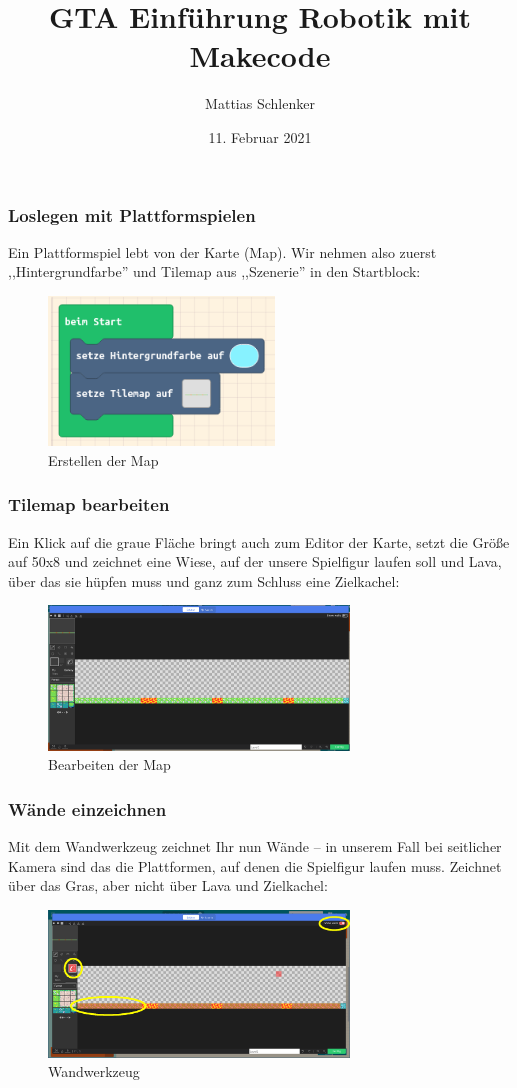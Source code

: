 \documentclass{beamer}
\title{GTA Einführung Robotik mit Makecode}
\author{Mattias Schlenker}
\institute{Wilhelm-Ostwald-Gymnasium}
\date{11. Februar 2021}
\begin{document}
\frame{\titlepage}

\begin{frame}
\frametitle{Loslegen mit Plattformspielen}
 
Ein Plattformspiel lebt von der Karte (Map). Wir nehmen also zuerst ,,Hintergrundfarbe'' und Tilemap aus ,,Szenerie'' in den Startblock:
 
 \begin{figure}
  \includegraphics[width=6cm]{game24.png}
  \caption{Erstellen der Map}
  \label{fig:game24}
\end{figure}

\end{frame}

\begin{frame}
 \frametitle{Tilemap bearbeiten}
 
 Ein Klick auf die graue Fläche bringt auch zum Editor der Karte, setzt die Größe auf 50x8 und zeichnet eine Wiese, auf der unsere Spielfigur laufen soll und Lava, über das sie hüpfen muss und ganz zum Schluss eine Zielkachel:
 
\begin{figure}
  \includegraphics[width=8cm]{game25.png}
  \caption{Bearbeiten der Map}
  \label{fig:game25}
\end{figure}
\end{frame}

\begin{frame}
 \frametitle{Wände einzeichnen}
 
  Mit dem Wandwerkzeug zeichnet Ihr nun Wände – in unserem Fall bei seitlicher Kamera sind das die Plattformen, auf denen die Spielfigur laufen muss. Zeichnet über das Gras, aber nicht über Lava und Zielkachel: 
 
\begin{figure}
  \includegraphics[width=8cm]{game26.png}
  \caption{Wandwerkzeug}
  \label{fig:game26}
\end{figure}
\end{frame}
\end{document}
